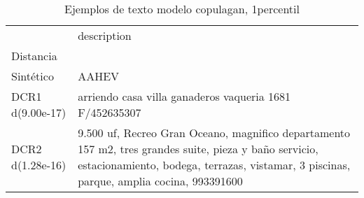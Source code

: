\begin{table}[H]
\centering
\fontsize{10}{14}\selectfont
\caption{Ejemplos de texto modelo copulagan, 1percentil}
\label{table-example-economicos-b-2-copulagan-1p-text}
\begin{tabular}{|l|m{35em}|}
\hline
\rowcolor[gray]{0.8}
 & description \\
Distancia &  \\
\hline Sintético & AAHEV \\
\hline DCR1 d(9.00e-17) & arriendo casa villa ganaderos vaqueria 1681 F/452635307 \\
\hline DCR2 d(1.28e-16) & 9.500 uf, Recreo Gran Oceano, magnifico departamento 157 m2, tres grandes suite, pieza y ba\~no servicio, estacionamiento, bodega, terrazas, vistamar, 3 piscinas, parque, amplia cocina, 993391600 \\
\hline
\end{tabular}
\end{table}
